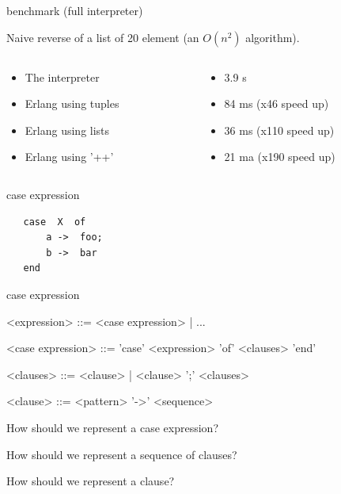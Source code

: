 \begin{frame}{benchmark (full interpreter)}

\pause Naive reverse of a list of 20 element (an $O(n^2)$ algorithm).

\begin{columns}
 \begin{column}{0.5\linewidth}
  \begin{itemize}
   \pause \item The interpreter
   \pause \item Erlang using tuples
   \pause \item Erlang using lists
   \pause \item Erlang using '++'
  \end{itemize}
 \end{column}
 \begin{column}{0.5\linewidth}
  \begin{itemize}
   \pause \item 3.9 s
   \pause \item 84 ms (x46 speed up)  
   \pause \item 36 ms (x110 speed up) 
   \pause \item 21 ma (x190 speed up) 
  \end{itemize}
 \end{column}
\end{columns}

\vspace{20pt}

\end{frame}

\begin{frame}[fragile]{case expression}

\begin{verbatim}
   case  X  of 
       a ->  foo;
       b ->  bar
   end
\end{verbatim}

\end{frame}

\begin{frame}{case expression}

\begin{grammar}
     <expression> ::=  <case expression> | ...  

     <case expression> ::= 'case' <expression> 'of' <clauses>  'end' 

     <clauses> ::=   <clause> | <clause> ';' <clauses>

     <clause> ::=  <pattern> '->' <sequence>
\end{grammar}

\pause How should we represent a case expression? 

\pause How should we represent a sequence of clauses?

\pause How should we represent a clause?

\end{frame}


